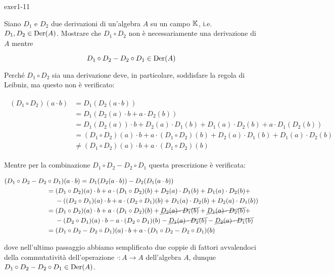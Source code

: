 
{exer1-11}
{
Siano $ D_{1} $ e $ D_{2} $ due derivazioni di un'algebra $ A $ su un campo $ \mathbb{K} $, i.e. $ D_{1},D_{2} \in \operatorname{Der}(A) $. Mostrare che $ D_{1} \circ D_{2} $ non è necessariamente una derivazione di $ A $ mentre

\begin{equation}
	D_{1} \circ D_{2} - D_{2} \circ D_{1} \in \operatorname{Der}(A)
\end{equation}
}
{
Perché $ D_{1} \circ D_{2} $ sia una derivazione deve, in particolare, soddisfare la regola di Leibniz, ma questo non è verificato:

\begin{align}
	\begin{split}
		(D_{1} \circ D_{2})(a \cdot b) &= D_{1}(D_{2}(a \cdot b)) \\
		&= D_{1}( D_{2}(a) \cdot b + a \cdot D_{2}(b) ) \\
		&= D_{1}(D_{2}(a)) \cdot b + D_{2}(a) \cdot D_{1}(b) + D_{1}(a) \cdot D_{2}(b) + a \cdot D_{1}(D_{2}(b)) \\
		&= (D_{1} \circ D_{2})(a) \cdot b + a \cdot (D_{1} \circ D_{2})(b) + D_{2}(a) \cdot D_{1}(b) + D_{1}(a) \cdot D_{2}(b) \\
		&\neq (D_{1} \circ D_{2})(a) \cdot b + a \cdot (D_{1} \circ D_{2})(b)
	\end{split}
\end{align}

Mentre per la combinazione $ D_{1} \circ D_{2} - D_{2} \circ D_{1} $ questa prescrizione è verificata:

\begin{align}
	\begin{split}
		(D_{1} \circ D_{2} - D_{2} &\circ D_{1})(a \cdot b) = D_{1}(D_{2}(a \cdot b)) - D_{2}(D_{1}(a \cdot b)) \\
		&= (D_{1} \circ D_{2})(a) \cdot b + a \cdot (D_{1} \circ D_{2})(b) + D_{2}(a) \cdot D_{1}(b) + D_{1}(a) \cdot D_{2}(b) + \\
		& \hal - ((D_{2} \circ D_{1})(a) \cdot b + a \cdot (D_{2} \circ D_{1})(b) + D_{1}(a) \cdot D_{2}(b) + D_{2}(a) \cdot D_{1}(b)) \\
		&= (D_{1} \circ D_{2})(a) \cdot b + a \cdot (D_{1} \circ D_{2})(b) + \cancel{ D_{2}(a) \cdot D_{1}(b) } + \cancel{ D_{1}(a) \cdot D_{2}(b) } + \\
		& \hal - (D_{2} \circ D_{1})(a) \cdot b - a \cdot (D_{2} \circ D_{1})(b) - \cancel{ D_{1}(a) \cdot D_{2}(b) } - \cancel{ D_{2}(a) \cdot D_{1}(b) } \\
		&= (D_{1} \circ D_{2} - D_{2} \circ D_{1})(a) \cdot b + a \cdot (D_{1} \circ D_{2} - D_{2} \circ D_{1})(b)
	\end{split}
\end{align}

dove nell'ultimo passaggio abbiamo semplificato due coppie di fattori avvalendoci della commutatività dell'operazione $ \cdot : A \to A $ dell'algebra $ A $, dunque $ D_{1} \circ D_{2} - D_{2} \circ D_{1} \in \operatorname{Der}(A) $.
}
